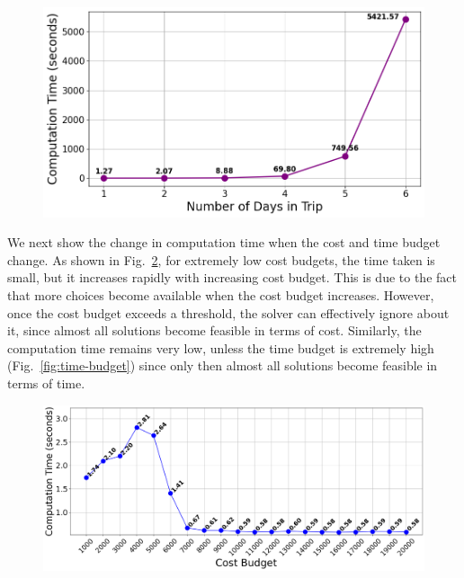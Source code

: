 \begin{figure}[t]
    \centering
\includegraphics[width=\figwidth]{plots/scalability_multiday.png}
    \label{fig:number-of-days}
\end{figure}

We next show the change in computation time when the cost and time budget change.
As shown in Fig.~\ref{fig:cost-budget}, for extremely low cost budgets, the time taken is small, but it increases rapidly with increasing cost budget. This is due to the fact that more choices become available when the cost budget increases. However, once the cost budget exceeds a threshold, the solver can effectively ignore about it, since almost all solutions become feasible in terms of cost.
Similarly, the computation time remains very low, unless the time budget is extremely high (Fig.~\ref{fig:time-budget}) since only then almost all solutions become feasible in terms of time.

\begin{figure}[t]
    \centering
    \includegraphics[width=\figwidth]{plots/costbudgetvstoc.png}
    \label{fig:cost-budget}
\end{figure}

